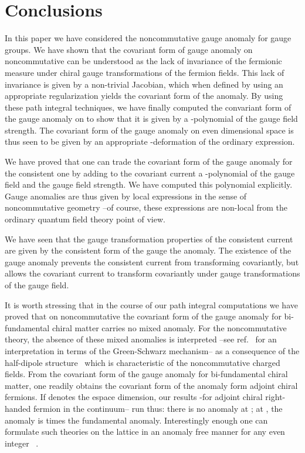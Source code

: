 \documentclass[a4paper,12pt]{article}
\def\RR{{\rm I\!\!\, R}}
\begin{document}
\section{Conclusions}

In this paper we have considered the noncommutative gauge anomaly for \coordHE{} 
gauge groups.
We have shown that the covariant form of gauge anomaly on noncommutative
\myHighlight{$\RR^{2n}$}\coordHE{} can be understood as the lack of invariance of the 
fermionic measure under chiral gauge transformations of the fermion fields. 
This lack of invariance is given by a non-trivial Jacobian, which when
defined by using an appropriate regularization  yields the covariant form 
of the anomaly. By using these path integral techniques, we have finally 
computed the convariant form of the gauge anomaly on \myHighlight{$\RR^{2n}$}\coordHE{} to show 
that it is given by a \myHighlight{$\star$}\coordHE{}-polynomial of the gauge field strength.
The covariant form of the gauge anomaly on even dimensional space is thus 
seen to be given by an appropriate \myHighlight{$\star$}\coordHE{}-deformation of the ordinary 
expression.   

We have  proved that one can trade the covariant form of the gauge
anomaly for the consistent one by adding to the covariant current a
\myHighlight{$\star$}\coordHE{}-polynomial of the gauge field and the gauge field strength.
We have computed this polynomial explicitly.
Gauge anomalies are thus given by local expressions in the sense of 
noncommutative geometry --of course, these expressions are non-local from 
the ordinary quantum field theory point of view. 

We have seen that the gauge transformation properties of the consistent 
current are given by the consistent form of the gauge the anomaly. The 
existence of the gauge anomaly  prevents 
the consistent current from transforming covariantly, but allows  
the covariant current to  transform covariantly under 
gauge transformations of the gauge field.      


It is worth stressing that in the course of our path integral computations 
 we have proved that on noncommutative \myHighlight{$\RR^{2n}$}\coordHE{} the covariant form 
of the gauge anomaly for bi-fundamental  
chiral matter  carries no mixed anomaly. For the noncommutative 
theory, the absence of these mixed anomalies is interpreted 
--see ref.~\cite{Intriligator:2001yu}  for an 
interpretation in terms of the Green-Schwarz mechanism-- as a consequence 
of the half-dipole structure~\cite{Alvarez-Gaume:2001bv} which is 
characteristic of the noncommutative charged fields. 
From the covariant form of the gauge anomaly for bi-fundamental chiral matter,
one readily obtains the covariant form of the anomaly form adjoint chiral 
fermions. If \coordHE{} denotes the espace dimension, our results -for adjoint chiral right-handed fermion in the continuum-- run thus: there is no anomaly at \coordHE{}; at \coordHE{}, the anomaly is \coordHE{} times the fundamental anomaly. Interestingly enough one can formulate such theories on the lattice in an anomaly 
free manner for any even integer \coordHE{}~\cite{Nishimura:2001dq}. 
\end{document}
